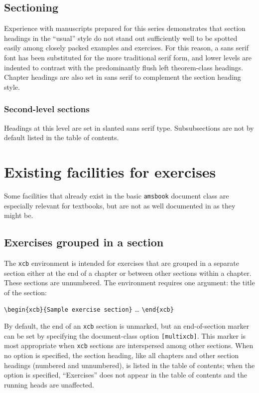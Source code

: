 \documentclass[multixcb]{amstext-l}
\theoremstyle{plain}
\theoremstyle{definition}
\newenvironment{exm}{%
  \par
  \begingroup
    \parindent0pt
    \leftskip2\normalparindent
    \obeylines
}{%
    \par
  \endgroup
}
\begin{document}
\subsection{Sectioning}

Experience with manuscripts prepared for this series
demonstrates that section headings in the ``usual'' style do not
stand out sufficiently well to be spotted easily among closely
packed examples and exercises.  For this reason, a sans serif font
has been substituted for the more traditional serif form, and lower
levels are indented to contrast with the predominantly flush left
theorem-class headings.  Chapter headings are also set in sans serif
to complement the section heading style.

\subsubsection{Second-level sections}

Headings at this level are set in slanted sans serif type.
Subsubsections are not by default listed in the table of contents.

\section{Existing facilities for exercises}

Some facilities that already exist in the basic \texttt{amsbook}
document class are especially relevant for textbooks, but are not
as well documented in \cite{INSTR} as they might be.

\subsection{Exercises grouped in a section}

The \texttt{xcb} environment is intended for exercises that are
grouped in a separate section either at the end of a chapter or
between other sections within a chapter.  These sections are
unnumbered.  The environment requires one argument: the title of
the section:
\begin{exm}
\verb+\begin{xcb}{Sample exercise section}+
\dots
\verb+\end{xcb}+
\end{exm}
\noindent
By default, the end of an \texttt{xcb} section is unmarked, but
an end-of-section marker can be set by specifying the document-class
option \texttt{[multixcb]}.  This marker is most appropriate when
\texttt{xcb} sections are interspersed among other sections.  When
no option is specified, the section heading, like all chapters and
other section headings (numbered and unnumbered), is listed in the
table of contents; when the option is specified, ``Exercises'' does
not appear in the table of contents and the running heads are
unaffected.
\end{document}
